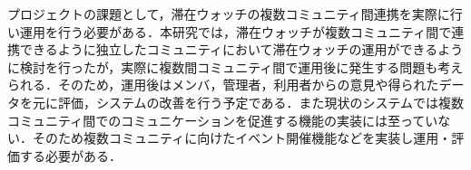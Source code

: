 プロジェクトの課題として，滞在ウォッチの複数コミュニティ間連携を実際に行い運用を行う必要がある．本研究では，滞在ウォッチが複数コミュニティ間で連携できるように独立したコミュニティにおいて滞在ウォッチの運用ができるように検討を行ったが，実際に複数間コミュニティ間で運用後に発生する問題も考えられる．そのため，運用後はメンバ，管理者，利用者からの意見や得られたデータを元に評価，システムの改善を行う予定である．また現状のシステムでは複数コミュニティ間でのコミュニケーションを促進する機能の実装には至っていない．そのため複数コミュニティに向けたイベント開催機能などを実装し運用・評価する必要がある．